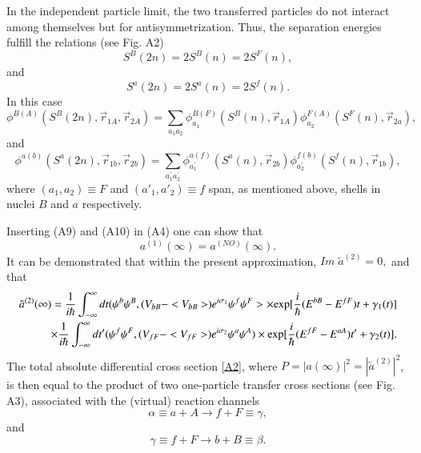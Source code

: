 \documentclass[a4paper,14pt]{article}
\begin{document}
In the independent particle limit, the two transferred particles do not interact among themselves but for antisymmetrization. 
Thus, the separation energies fulfill the relations (see Fig. A2)
\begin{equation}
S^B(2n) = 2 S^B(n) = 2S^F(n),
\end{equation}
and 
\begin{equation}
S^a(2n) = 2 S^a(n) = 2 S^f(n).
\end{equation}
In this case 
\begin{equation}
\phi^{B(A)} (S^B(2n), \vec r_{1A},\vec r_{2A}) = \sum_{a_1 a_2} \phi_{a_1}^{B(F)} (S^B(n),\vec r_{1A}) 
\phi_{a_{2}}^{F(A)} (S^F(n),\vec r_{2a}),
\end{equation}
and 
\begin{equation}
\phi^{a(b)} (S^a(2n), \vec r_{1b},\vec r_{2b}) = 
\sum_{a^{'}_{1} a^{'}_{2}} \phi_{a^{'}_1}^{a(f)} (S^a(n),\vec r_{2b}) 
\phi_{a^{'}_{2}}^{f(b)} (S^f(n),\vec r_{1b}),
\end{equation}
where $(a_1, a_2) \equiv F$ and $(a'_1, a'_2) \equiv f$ span, as mentioned above, shells in nuclei $B$ and $a$ respectively. 

Inserting (A9) and (A10) in (A4) one can show that 
\begin{equation}
a^{(1)} (\infty) = a^{(NO)}(\infty).
\end{equation}
It can be demonstrated  that within the present approximation, $Im \; \tilde a^{(2)} =0,$ and that 
\begin{eqnarray}
\tilde a^{(2)} (\infty) = \frac{1}{i \hbar} \int^{\infty}_{-\infty} dt (\psi^b \psi^B, (V_{bB} - <V_{bB}>) e^{i \sigma_1} \psi^f \psi^F > \times 
{\rm exp} [\frac{i}{\hbar} (E^{bB} - E^{fF}) t + \gamma_1(t)] \nonumber  \\
\times \frac{1}{i \hbar} \int^{\infty}_{-\infty} dt' (\psi^f \psi^F, (V_{fF} - <V_{fF}>) e^{i \sigma_2} \psi^a \psi^A ) \times 
{\rm exp} [\frac{i}{\hbar} (E^{fF} - E^{aA}) t' + \gamma_2(t)].
\label{A12}
\end{eqnarray}
The total absolute differential cross section \ref{A2}, where $P = |a(\infty)|^2 = |\tilde a^{(2)}|^2$, is then equal to the product of two one-particle transfer cross sections (see Fig. A3), associated with the (virtual) reaction channels
\begin{equation}
\alpha \equiv a+A \to f +F \equiv \gamma,
\end{equation}
and 
\begin{equation}
\gamma \equiv f +F \to b+B \equiv \beta.
\end{equation}
\end{document}
